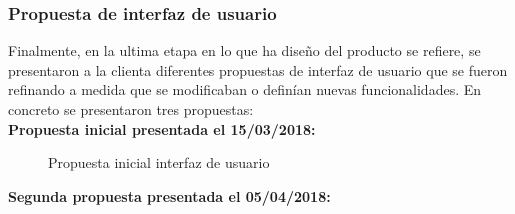 \documentclass[11pt,a4paper]{article}
\begin{document}
\subsubsection{Propuesta de interfaz de usuario}\label{propuestaInterfazUsuario} 
Finalmente, en la ultima etapa en lo que ha diseño del producto se refiere, se presentaron a la clienta diferentes propuestas de interfaz de usuario que se fueron refinando a medida que se modificaban o definían nuevas funcionalidades. En concreto se presentaron tres propuestas:
\\

\noindent\textbf{Propuesta inicial presentada el 15/03/2018:}

\begin{figure}[H]
\centering
{}
\caption{Propuesta inicial interfaz de usuario}
\end{figure}
\pagebreak 

\noindent\textbf{Segunda propuesta presentada el 05/04/2018:}
\end{document}
